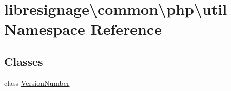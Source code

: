 \hypertarget{namespacelibresignage_1_1common_1_1php_1_1util}{}\section{libresignage\textbackslash{}common\textbackslash{}php\textbackslash{}util Namespace Reference}
\label{namespacelibresignage_1_1common_1_1php_1_1util}
\subsection*{Classes}
\begin{DoxyCompactItemize}
\item 
class \hyperlink{classlibresignage_1_1common_1_1php_1_1util_1_1VersionNumber}{Version\+Number}
\end{DoxyCompactItemize}

